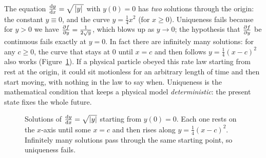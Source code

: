\begin{trapbox}
The equation $\frac{\mathrm{d} y}{\mathrm{d} x}=\sqrt{\,\lvert y\rvert\,}$ with $y(0)=0$ has \emph{two} solutions
through the origin: the constant $y\equiv 0$, and the curve $y=\tfrac14 x^2$ (for
$x\ge 0$). Uniqueness fails because for $y>0$ we have $\frac{\partial f}{\partial y} = \tfrac{1}{2\sqrt{y}}$,
which blows up as $y\to 0$; the hypothesis that $\frac{\partial f}{\partial y}$ be continuous fails
exactly at $y=0$. In fact there are infinitely many solutions: for any $c\ge 0$, the
curve that stays at $0$ until $x=c$ and then follows $y=\tfrac14(x-c)^2$ also works
(Figure~\ref{ch37:fig-nonunique}).
If a physical particle obeyed this rate law starting from rest at the origin, it
could sit motionless for an arbitrary length of time and then start moving, with
nothing in the law to say when. Uniqueness is the mathematical condition
that keeps a physical model \emph{deterministic}: the present state fixes the
whole future.
\end{trapbox}

\begin{figure}[htbp]
\centering
{}
\caption{Solutions of $\frac{\mathrm{d} y}{\mathrm{d} x}=\sqrt{\lvert y\rvert}$ starting from $y(0)=0$. Each one
rests on the $x$-axis until some $x=c$ and then rises along
$y=\tfrac14(x-c)^2$. Infinitely many solutions pass through the same starting
point, so uniqueness fails.}
\label{ch37:fig-nonunique}
\end{figure}

